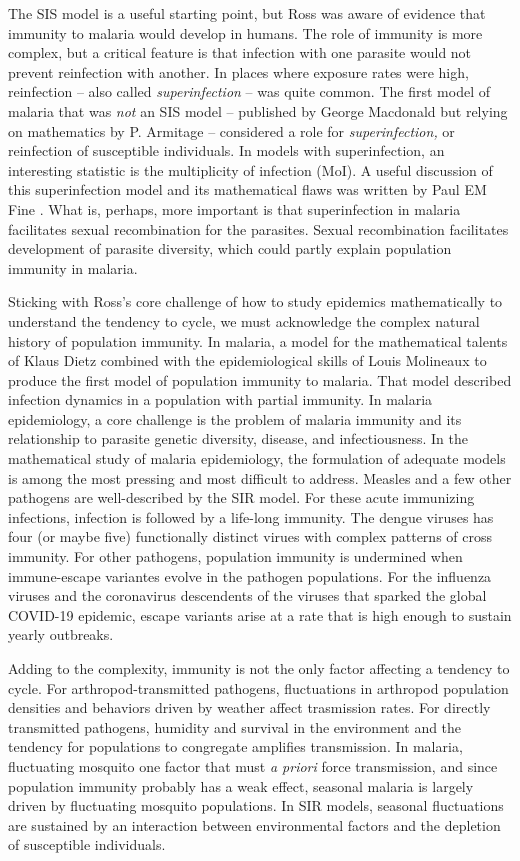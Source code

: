 \documentclass[
]{book}
\begin{document}
The SIS model is a useful starting point, but Ross was aware of evidence that immunity to malaria would develop in humans.
The role of immunity is more complex, but a critical feature is that infection with one parasite would not prevent reinfection with another.
In places where exposure rates were high, reinfection -- also called \emph{superinfection} -- was quite common.
The first model of malaria that was \emph{not} an SIS model -- published by George Macdonald but relying on mathematics by P. Armitage --
considered a role for \emph{superinfection,} or reinfection of susceptible individuals.
In models with superinfection, an interesting statistic is the multiplicity of infection (MoI).
A useful discussion of this superinfection model and its mathematical flaws was written by Paul EM Fine \autocite{FinePEM1975SuperinfectionProblem}.
What is, perhaps, more important is that superinfection in malaria facilitates sexual recombination for the parasites.
Sexual recombination facilitates development of parasite diversity, which could partly explain population immunity in malaria.

Sticking with Ross's core challenge of how to study epidemics mathematically to understand the tendency to cycle, we must acknowledge
the complex natural history of population immunity. In malaria,
a model for the mathematical talents of Klaus Dietz combined with the epidemiological skills of Louis Molineaux to produce the first model of population immunity to malaria.
That model described infection dynamics in a population with partial immunity.
In malaria epidemiology, a core challenge is the problem of malaria immunity and its relationship to parasite genetic diversity, disease, and infectiousness.
In the mathematical study of malaria epidemiology, the formulation of adequate models is among the most pressing and most difficult to address.
Measles and a few other pathogens are well-described by the SIR model.
For these acute immunizing infections, infection is followed by a life-long immunity.
The dengue viruses has four (or maybe five) functionally distinct virues with complex patterns of cross immunity.
For other pathogens, population immunity is undermined when immune-escape variantes evolve in the pathogen populations.
For the influenza viruses and the coronavirus descendents of the viruses that sparked the global COVID-19 epidemic, escape variants arise at a rate that is high enough to sustain yearly outbreaks.

Adding to the complexity, immunity is not the only factor affecting a tendency to cycle.
For arthropod-transmitted pathogens, fluctuations in arthropod population densities and behaviors driven by weather affect trasmission rates.
For directly transmitted pathogens, humidity and survival in the environment and the tendency for populations to congregate amplifies transmission.
In malaria, fluctuating mosquito one factor that must \emph{a priori} force transmission, and since population immunity probably has a weak effect,
seasonal malaria is largely driven by fluctuating mosquito populations.
In SIR models, seasonal fluctuations are sustained by an interaction between environmental factors and the depletion of susceptible individuals.
\end{document}
